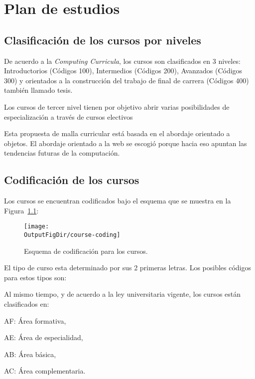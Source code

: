 \chapter{Plan de estudios \YYYY}\label{chap:GeneralInfo}

\section{Clasificación de los cursos por niveles}
De acuerdo a la \textit{Computing Curricula}, los cursos son clasificados en 3 niveles: Introductorios (Códigos 100), 
Intermedios  (Códigos 200), Avanzados  (Códigos 300) y orientados a la construcción del trabajo de final de carrera  (Códigos 400) también llamado tesis.

Los cursos de tercer nivel tienen por objetivo abrir varias posibilidades de especialización a través de cursos electivos

Esta propuesta de malla curricular está basada en el abordaje orientado a objetos. 
El abordaje orientado a la web se escogió porque hacia eso apuntan las tendencias 
futuras de la computación.

\section{Codificación de los cursos}
Los cursos se encuentran codificados bajo el esquema que se muestra en la Figura~\ref{fig:course-number}:

\begin{figure}[ht]
   \centering
   \texttt{[image: \\OutputFigDir/course-coding]}
   \caption{Esquema de codificación para los cursos.}
   \label{fig:course-number}
\end{figure}

El tipo de curso esta determinado por sus 2 primeras letras. Los posibles códigos para estos tipos son:


Al mismo tiempo, y de acuerdo a la ley universitaria vigente, los cursos están clasificados en:
\begin{inparadesc}
\item [AF:] Área formativa,
\item [AE:] Área de especialidad,
\item [AB:] Área básica,
\item [AC:] Área complementaria.
\end{inparadesc}




